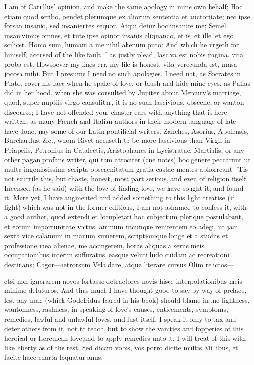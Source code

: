 {I am of Catullus' opinion, and make the same apology in mine own
behalf; Hoc etiam quod scribo, pendet plerumque ex aliorum sententia et
auctoritate; nec ipse forsan insanio, sed insanientes sequor. Atqui
detur hoc insanire me; Semel insanivimus omnes, et tute ipse opinor
insanis aliquando, et is, et ille, et ego, scilicet. Homo sum,
humani a me nihil alienum puto: And which he urgeth for himself,
accused of the like fault, I as justly plead, lasciva est nobis
pagina, vita proba est. Howsoever my lines err, my life is honest,
vita verecunda est, musa jocosa mihi. But I presume I need no
such apologies, I need not, as Socrates in Plato, cover his face when
he spake of love, or blush and hide mine eyes, as Pallas did in her
hood, when she was consulted by Jupiter about Mercury's marriage, quod,
super nuptiis virgo consulitur, it is no such lascivious, obscene, or
wanton discourse; I have not offended your chaster ears with anything
that is here written, as many French and Italian authors in their
modern language of late have done, nay some of our Latin pontificial
writers, Zanches, Asorius, Abulensis, Burchardus, \&c., whom Rivet
accuseth to be more lascivious than Virgil in Priapeiis, Petronius in
Catalectis, Aristophanes in Lycistratae, Martialis, or any other pagan
profane writer, qui tam atrociter (one notes) hoc genere
peccarunt ut multa ingeniosissime scripta obscaenitatum gratia castae
mentes abhorreant. 'Tis not scurrile this, but chaste, honest, most
part serious, and even of religion itself. Incensed (as he said)
with the love of finding love, we have sought it, and found it. More
yet, I have augmented and added something to this light treatise (if
light) which was not in the former editions, I am not ashamed to
confess it, with a good author, quod extendi et locupletari hoc
subjectum plerique postulabant, et eorum importunitate victus, animum
utcunque renitentem eo adegi, ut jam sexta vice calamum in manum
sumerem, scriptionique longe et a studiis et professione mea alienae,
me accingerem, horas aliquas a seriis meis occupationibus interim
suffuratus, easque veluti ludo cuidam ac recreationi destinans;
Cogor---retrorsum
Vela dare, atque literare cursus
Olim relictos---

etsi non ignorarem novos fortasse detractores novis hisce
interpolationibus meis minime defuturos. 
And thus much I have thought good to say by way of preface, lest any
man (which Godefridus feared in his book) should blame in me
lightness, wantonness, rashness, in speaking of love's causes,
enticements, symptoms, remedies, lawful and unlawful loves, and lust
itself, I speak it only to tax and deter others from it, not to
teach, but to show the vanities and fopperies of this heroical or
Herculean love,and to apply remedies unto it. I will treat of
this with like liberty as of the rest.
Sed dicam vobis, vos porro dicite multis
Millibus, et facite haec charta loquatur anus.

}
